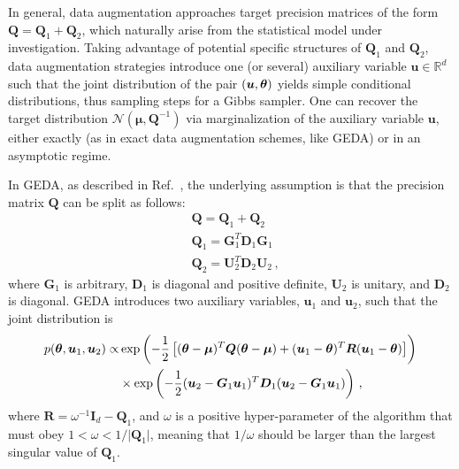 In general, data augmentation approaches target precision matrices of the form $\bm Q = \bm Q_1 + \bm Q_2$, which naturally arise from the statistical model under investigation.  Taking advantage of potential specific structures of $\bm Q_1$ and $\bm Q_2$, data augmentation strategies introduce one (or several) auxiliary variable $\bm u \in \mathbb R^d$ such that the joint distribution of the pair $(\bm u, \bm{\theta})$ yields simple conditional distributions, thus sampling steps for a Gibbs sampler. One can recover the target distribution $\mathcal{N}(\bm \mu, \bm Q^{-1})$ via marginalization of the auxiliary variable $\bm u$, either exactly (as in exact data augmentation schemes, like GEDA) or in an asymptotic regime.

In GEDA, as described in Ref.~\cite{Marnissi:2019aa}, the underlying assumption is that the precision matrix $\bm Q$ can be split as follows:
\begin{equation}
\begin{split}
    & \bm Q = \bm Q_1 + \bm Q_2 \\
    & \bm Q_1 = \bm G_1^T \bm D_1 \bm G_1 \\
    & \bm Q_2 = \bm U_2^T \bm D_2 \bm U_2 \,,
\end{split}
\label{eq:cosmo-precision_split}
\end{equation}
where $\bm G_1$ is arbitrary, $\bm D_1$ is diagonal and positive definite, $\bm U_2$ is unitary, and  $\bm D_2$ is diagonal. 
GEDA introduces two auxiliary variables, $\bm u_1$ and $\bm u_2$, such that the joint distribution is
\begin{equation}
\begin{split}
    p(\bm{\theta}, \bm u_1, \bm u_2) \propto & \exp\left(-\frac{1}{2}\left[(\bm{\theta}-\bm\mu)^T \bm Q(\bm{\theta}-\bm\mu) + (\bm u_1 - \bm{\theta})^T \bm R(\bm u_1 - \bm{\theta})\right] \right) \\
    &\times \exp\left( -\frac{1}{2}(\bm u_2-\bm G_1 \bm  u_1)^T \bm D_1(\bm u_2-\bm G_1 \bm  u_1)\right) \,,
\end{split}
\end{equation}
where $\bm R = \omega^{-1} \bm I_d - \bm Q_1$, and  $\omega$ is a positive hyper-parameter of the algorithm that must obey $1 < \omega < 1/ \lvert \bm Q_1 \rvert$, meaning that $1/\omega$ should be larger than the largest singular value of $\bm Q_1$. 

